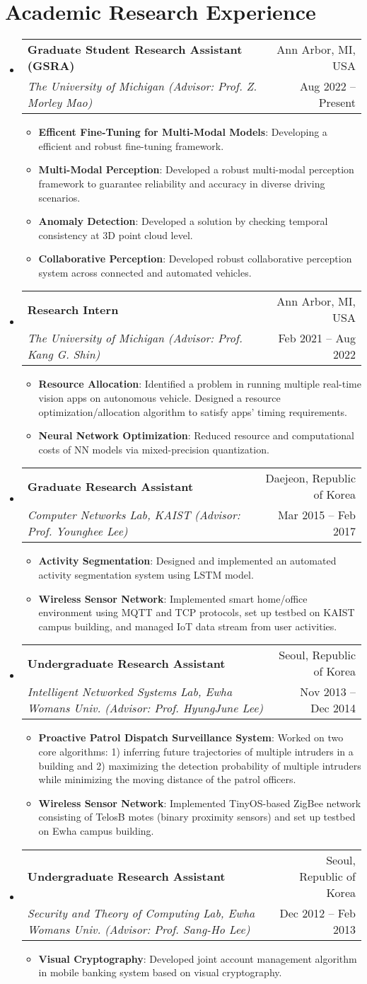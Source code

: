\documentclass[letterpaper,oneside,11pt]{article}
\makeatletter
\newcommand{\resumeItem}[2]{
  \item\small{
    \textbf{#1}{: #2 \vspace{-2pt}}
  }
}
\newcommand{\resumeSubheading}[4]{
  \vspace{-2pt}\item
    \begin{tabularx}{0.97\textwidth}[t]{X@{\hspace{-5pt}}r}
      \textbf{#1} & #2 \\
      \textit{\small#3} & \small #4 \\
    \end{tabularx}\vspace{-6pt}
}
\newcommand{\resumeSubHeadingListStart}{\begin{itemize}[leftmargin=*]}
\newcommand{\resumeSubHeadingListEnd}{\end{itemize}}
\newcommand{\resumeItemListStart}{\begin{itemize}}
\newcommand{\resumeItemListEnd}{\end{itemize}\vspace{-5pt}}
\makeatother
\begin{document}
\section{Academic Research Experience}
  \resumeSubHeadingListStart
    \resumeSubheading
    {Graduate Student Research Assistant (GSRA)}{Ann Arbor, MI, USA}
    {The University of Michigan (Advisor: Prof. Z. Morley Mao)}{Aug 2022 -- Present}
    \resumeItemListStart
      \resumeItem{Efficent Fine-Tuning for Multi-Modal Models}{Developing a efficient and robust fine-tuning framework.}
      \resumeItem{Multi-Modal Perception}{Developed a robust multi-modal perception framework to guarantee reliability and accuracy in diverse driving scenarios.}
      \resumeItem{Anomaly Detection}{Developed a solution by checking temporal consistency at 3D point cloud level.}
      \resumeItem{Collaborative Perception}{Developed robust collaborative perception system across connected and automated vehicles.}
    \resumeItemListEnd
    \resumeSubheading
      {Research Intern}{Ann Arbor, MI, USA}
      {The University of Michigan (Advisor: Prof. Kang G. Shin)}{Feb 2021 -- Aug 2022}
      \resumeItemListStart
        \resumeItem{Resource Allocation}{Identified a problem in running multiple real-time vision apps on autonomous vehicle. Designed a resource optimization/allocation algorithm to satisfy apps' timing requirements.}
        \resumeItem{Neural Network Optimization}{Reduced resource and computational costs of NN models via mixed-precision quantization.}
      \resumeItemListEnd
    \resumeSubheading
      {Graduate Research Assistant}{Daejeon, Republic of Korea}
      {Computer Networks Lab, KAIST (Advisor: Prof. Younghee Lee)}{Mar 2015 -- Feb 2017}
      \resumeItemListStart
        \resumeItem{Activity Segmentation}{Designed and implemented an automated activity segmentation system using LSTM model.}
        \resumeItem{Wireless Sensor Network}{Implemented smart home/office environment using MQTT and TCP protocols, set up testbed on KAIST campus building, and managed IoT data stream from user activities.}
      \resumeItemListEnd
    \resumeSubheading
      {Undergraduate Research Assistant}{Seoul, Republic of Korea}
      {Intelligent Networked Systems Lab, Ewha Womans Univ. (Advisor: Prof. HyungJune Lee)}{Nov 2013 -- Dec 2014}
      \resumeItemListStart   
        \resumeItem{Proactive Patrol Dispatch Surveillance System}{Worked on two core algorithms: 1) inferring future trajectories of multiple intruders in a building and 2) maximizing the detection probability of multiple intruders while minimizing the moving distance of the patrol officers.}
        \resumeItem{Wireless Sensor Network}{Implemented TinyOS-based ZigBee network consisting of TelosB motes (binary proximity sensors) and set up testbed on Ewha campus building.}
      \resumeItemListEnd
    \resumeSubheading
      {Undergraduate Research Assistant}{Seoul, Republic of Korea}
      {Security and Theory of Computing Lab, Ewha Womans Univ. (Advisor: Prof. Sang-Ho Lee)}{Dec 2012 -- Feb 2013}
      \resumeItemListStart
        \resumeItem{Visual Cryptography}{Developed joint account management algorithm in mobile banking system based on visual cryptography.}
      \resumeItemListEnd
  \resumeSubHeadingListEnd
\end{document}
